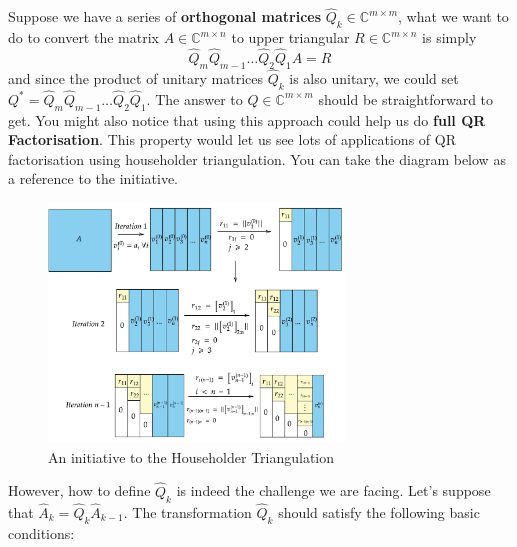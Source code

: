 \noindent Suppose we have a series of \textbf{orthogonal matrices} $\hat{Q}_{k} \in \mathbb{C}^{m \times m}$, what we want to do to convert the matrix $A \in \mathbb{C}^{m \times n}$ to upper triangular $R \in \mathbb{C}^{m \times n}$ is simply
\[
\hat{Q}_{m}\hat{Q}_{m - 1}\ldots \hat{Q}_{2}\hat{Q}_1 A= R
\] 
and since the product of unitary matrices $\hat{Q}_{k}$ is also unitary, we could set $Q^{*} = \hat{Q}_{m}\hat{Q}_{m - 1}\ldots \hat{Q}_{2}\hat{Q}_{1}$. The answer to $Q \in \mathbb{C}^{m \times m}$ should be straightforward to get. You might also notice that using this approach could help us do \textbf{full QR Factorisation}. This property would let us see lots of applications of QR factorisation using householder triangulation. You can take the diagram below as a reference to the initiative.
\begin{figure}[H]
  \centering
  \includegraphics[width=0.7\textwidth]{./imgs/householder.png}
  \caption{An initiative to the Householder Triangulation}
  \label{fig:householder}
\end{figure}

\noindent However, how to define \(\hat{Q}_{k}\) is indeed the challenge we are facing. Let's suppose that \(\hat{A}_{k} = \hat{Q}_{k}\hat{A}_{k -1}\). The transformation \(\hat{Q}_{k}\) should satisfy the following basic conditions:

